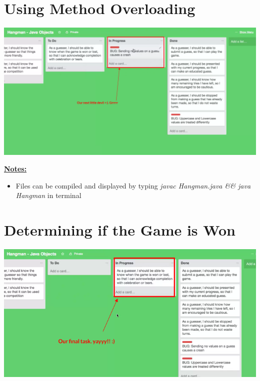 \documentclass[12pt]{article}
\begin{document}
\bigskip

\section{Using Method Overloading}

\bigskip

\begin{center}
\includegraphics[width=\linewidth]{images/part_4_notes_3.png}
\end{center}

\bigskip

\underline{\textbf{Notes:}}

\bigskip

\begin{itemize}
    \item Files can be compiled and displayed by typing \textit{javac Hangman.java \&\& java Hangman}
    in terminal
\end{itemize}

\bigskip

\section{Determining if the Game is Won}

\bigskip

\begin{center}
\includegraphics[width=\linewidth]{images/part_4_notes_5.png}
\end{center}
\end{document}
